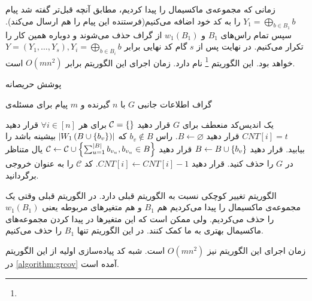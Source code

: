 زمانی که مجموعه‌ی ماکسیمال را پیدا کردیم، مطابق آنچه قبل‌تر گفته شد پیام
 $Y_1 = \bigoplus\limits_{b \in B_1} b$
 را به کد خود اضافه می‌کنیم(فرستنده این پیام را هم ارسال می‌کند). سپس تمام راس‌های
 $B_1$
 و
 $w_1(B_1)$
 از گراف حذف می‌شوند و دوباره همین کار را تکرار می‌کنیم. در نهایت پس از 
 $s$
 گام کد نهایی برابر
 $Y = (Y_1, \ldots, Y_s), Y_i =  \bigoplus\limits_{b \in B_i} b$
 خواهد بود. این الگوریتم
 \GRCOVone\footnote{}
 	نام دارد. زمان اجرای این الگوریتم برابر
 	$O(mn^2)$
 	است.
 	\begin{algorithm}
 		\caption[
 		پوشش حریصانه
 		]{
 			پوشش حریصانه
 			\cite{pliable2015paper}}
 		\label{algorithm:grcov}
 		\begin{algorithmic}[1]
 			\Require
 			گراف اطلاعات جانبی
 			$G$
 			با
 			$n$
 			گیرنده و
 			$m$
 			پیام برای مسئله‌ی
 			
 			\Ensure
 			یک اندیس‌کد منعطف برای
 			$G$
 			\State 
 			قرار دهید
 			$\mathcal{C} = \left\{  \right\}$
 			\State برای هر
 			 $\forall i \in [n]$
 			 قرار دهید
 			 $CNT[i] = t$ 
		 			\State
		 			قرار دهید
		 			 $B \leftarrow \varnothing$.
				 			\State
				 			راس
				 			 $b_v \notin B$ 
				 			 که
				 			 $\left|{W_1\left(B \cup\left\{ b_v \right\}\right)}\right|$
				 			 بیشینه باشد را بیابید.
				 			\State قرار دهید
				 			$B \leftarrow B \cup\left\{ b_v \right\}$
		 			\EndWhile
		 			\State قرار دهید
		 			 $\mathcal{C} \leftarrow \mathcal{C} \cup\left\{ \sum_{u=1}^{\left|{B}\right|} b_{v_u}, b_{v_u} \in B \right\}$
		 	\State یال متناظر در
		 	 $G$
		 	 را حذف کنید.
		 	 \EndIf
		 			\State قرار دهید $CNT[i] \leftarrow CNT[i]-1$.
		 			\EndFor
 			\EndWhile
 			\State کد
 			 $\mathcal{C}$
 			 را به عنوان خروجی برگردانید.
 		\end{algorithmic}
 	\end{algorithm}

 الگوریتم
 	تغییر کوچکی نسبت به الگوریتم قبلی دارد. در الگوریتم قبلی وقتی یک مجموعه‌ی ماکسیمال را پیدا می‌کردیم هم
 $B_1$
 و هم متغیرهای مربوطه یعنی
 $w_1(B_1)$
 را حذف می‌کردیم. ولی ممکن است که این متغیرها در پیدا کردن مجموعه‌های ماکسیمال بهتری به ما کمک کنند. در این الگوریتم تنها
 $B_1$
 را حذف می‌کنیم.
 
 زمان اجرای این الگوریتم نیز
 $O(mn^2)$
 است. شبه کد 
 پیاده‌سازی اولیه از این الگوریتم در
 \autoref{algorithm:grcov}
 آمده است.
